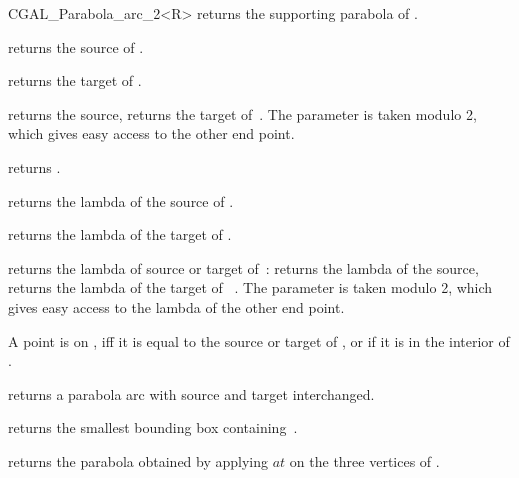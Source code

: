 \begin{classtemplate}{CGAL_Parabola_arc_2<R>}
       { returns the supporting parabola of \var.}

       {returns the source of \var.}

       {returns the target of \var.}

       { returns
        the source,  returns the target of~\var. 
        The parameter  is taken modulo 2, which gives 
        easy access to the other end point.}

       {returns .}

       {returns the lambda of the source of \var.}

       {returns the lambda of the target of \var.}

       {returns the lambda of source or target of~\var:
         returns the lambda of the source,
         returns the lambda of the target of ~\var.
        The parameter  is taken modulo 2, which gives easy
        access to the lambda of the other end point.}
 
       {A point is on \var, iff it is equal to the source or target 
        of \var, or if it is in the interior of \var.}

       {returns a parabola arc with source and target interchanged.}

       {returns the smallest bounding box containing~\var.}

\hidden{}
       {returns the parabola obtained by applying $at$ on the three
        vertices of \var.}


\end{classtemplate} 

%
%
%
%

